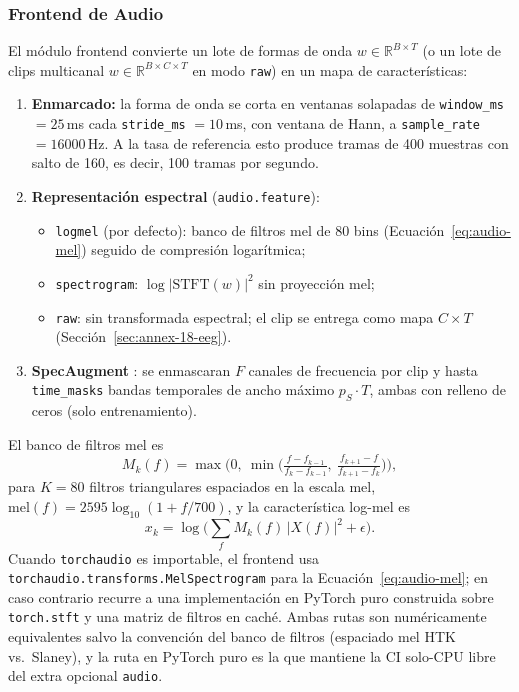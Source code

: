 \subsubsection{Frontend de Audio}

El módulo frontend convierte un lote de formas de onda $w \in \mathbb{R}^{B \times T}$ (o un lote de clips multicanal $w \in \mathbb{R}^{B \times C \times T}$ en modo \texttt{raw}) en un mapa de características:

\begin{enumerate}[leftmargin=*]
    \item \textbf{Enmarcado:} la forma de onda se corta en ventanas solapadas de \texttt{window\_ms} $=25$\,ms cada \texttt{stride\_ms} $=10$\,ms, con ventana de Hann, a \texttt{sample\_rate} $=16000$\,Hz. A la tasa de referencia esto produce tramas de 400 muestras con salto de 160, es decir, 100 tramas por segundo.
    \item \textbf{Representación espectral} (\texttt{audio.feature}):
    \begin{itemize}[leftmargin=*]
        \item \texttt{logmel} (por defecto): banco de filtros mel de $80$ bins (Ecuación~\ref{eq:audio-mel}) seguido de compresión logarítmica;
        \item \texttt{spectrogram}: $\log|\mathrm{STFT}(w)|^2$ sin proyección mel;
        \item \texttt{raw}: sin transformada espectral; el clip se entrega como mapa $C \times T$ (Sección~\ref{sec:annex-18-eeg}).
    \end{itemize}
    \item \textbf{SpecAugment} \citep{Park2019}: se enmascaran $F$ canales de frecuencia por clip y hasta \texttt{time\_masks} bandas temporales de ancho máximo $p_S \cdot T$, ambas con relleno de ceros (solo entrenamiento).
\end{enumerate}

El banco de filtros mel es
\begin{equation}
M_k(f) = \max\Big(0,\ \min\Big(\tfrac{f-f_{k-1}}{f_k-f_{k-1}},\ \tfrac{f_{k+1}-f}{f_{k+1}-f_k}\Big)\Big),
\label{eq:audio-filterbank}
\end{equation}
para $K = 80$ filtros triangulares espaciados en la escala mel, $\mathrm{mel}(f) = 2595 \log_{10}(1 + f/700)$, y la característica log-mel es
\begin{equation}
x_k = \log\Big(\sum_{f} M_k(f)\,|X(f)|^2 + \epsilon\Big).
\label{eq:audio-mel}
\end{equation}
Cuando \texttt{torchaudio} es importable, el frontend usa \texttt{torchaudio.transforms.MelSpectrogram} para la Ecuación~\ref{eq:audio-mel}; en caso contrario recurre a una implementación en PyTorch puro construida sobre \texttt{torch.stft} y una matriz de filtros en caché. Ambas rutas son numéricamente equivalentes salvo la convención del banco de filtros (espaciado mel HTK vs.\ Slaney), y la ruta en PyTorch puro es la que mantiene la CI solo-CPU libre del extra opcional \texttt{audio}.

